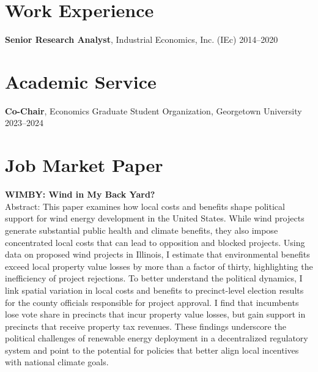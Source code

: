 \documentclass[11pt]{article}
\begin{document}


\section*{Work Experience}

\textbf{Senior Research Analyst}, Industrial Economics, Inc. (IEc) \hfill 2014–2020


\section*{Academic Service}

\textbf{Co-Chair}, Economics Graduate Student Organization, Georgetown University \hfill 2023–2024

\section*{Job Market Paper}

\textbf{WIMBY: Wind in My Back Yard?} \\
Abstract: This paper examines how local costs and benefits shape political support for wind energy development in the United States. While wind projects generate substantial public health and climate benefits, they also impose concentrated local costs that can lead to opposition and blocked projects. Using data on proposed wind projects in Illinois, I estimate that environmental benefits exceed local property value losses by more than a factor of thirty, highlighting the inefficiency of project rejections. To better understand the political dynamics, I link spatial variation in local costs and benefits to precinct-level election results for the county officials responsible for project approval. I find that incumbents lose vote share in precincts that incur property value losses, but gain support in precincts that receive property tax revenues. These findings underscore the political challenges of renewable energy deployment in a decentralized regulatory system and point to the potential for policies that better align local incentives with national climate goals.
\end{document}
